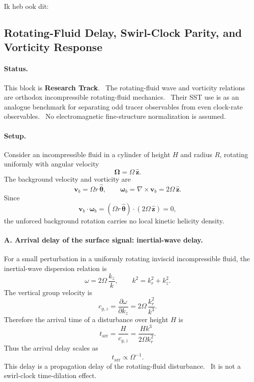 Ik heb ook dit:

\providecommand{\rhoF}{\rho_{\!f}}
\providecommand{\vSwirl}{\mathbf{v}_{\!\boldsymbol{\circlearrowleft}}}
\providecommand{\rc}{r_c}
\providecommand{\Om}{\Omega}
\providecommand{\uTheta}{u_\theta}
\providecommand{\taup}{\tau}
\providecommand{\dta}{\Delta t}

\subsection{Rotating-Fluid Delay, Swirl-Clock Parity, and Vorticity Response}
\label{sec:rotating_fluid_swirl_clock_parity}

\paragraph{Status.}
This block is \textbf{Research Track}.  The rotating-fluid wave and vorticity
relations are orthodox incompressible rotating-fluid mechanics.  Their SST use
is as an analogue benchmark for separating odd tracer observables from even
clock-rate observables.  No electromagnetic fine-structure normalization is
assumed.

\paragraph{Setup.}
Consider an incompressible fluid in a cylinder of height \(H\) and radius \(R\),
rotating uniformly with angular velocity
\[
\boldsymbol{\Omega}=\Omega\,\hat{\mathbf z}.
\]
The background velocity and vorticity are
\[
\mathbf v_b=\Omega r\,\hat{\boldsymbol\theta},
\qquad
\boldsymbol\omega_b=\nabla\times\mathbf v_b
=
2\Omega\,\hat{\mathbf z}.
\]
Since
\[
\mathbf v_b\cdot\boldsymbol\omega_b
=
(\Omega r\,\hat{\boldsymbol\theta})\cdot
(2\Omega\,\hat{\mathbf z})
=
0,
\]
the unforced background rotation carries no local kinetic helicity density.

\paragraph{A. Arrival delay of the surface signal: inertial-wave delay.}

For a small perturbation in a uniformly rotating inviscid incompressible fluid,
the inertial-wave dispersion relation is
\[
\omega
=
2\Omega\,\frac{k_z}{k},
\qquad
k^2=k_r^2+k_z^2 .
\]
The vertical group velocity is
\[
c_{g,z}
=
\frac{\partial\omega}{\partial k_z}
=
2\Omega\,\frac{k_r^2}{k^3}.
\]
Therefore the arrival time of a disturbance over height \(H\) is
\[
\boxed{
t_{\mathrm{arr}}
=
\frac{H}{c_{g,z}}
=
\frac{Hk^3}{2\Omega k_r^2}.
}
\]
Thus the arrival delay scales as
\[
\boxed{
t_{\mathrm{arr}}\propto \Omega^{-1}.
}
\]
This delay is a propagation delay of the rotating-fluid disturbance.  It is
not a swirl-clock time-dilation effect.

